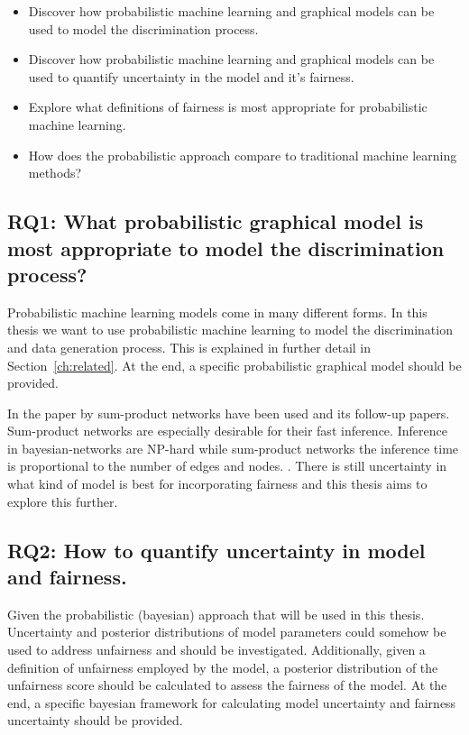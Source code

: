 \begin{itemize}
    \item Discover how probabilistic machine learning and graphical models can be used to model the discrimination process.
    \item Discover how probabilistic machine learning and graphical models can be used to quantify uncertainty in the model and it's fairness.
    \item Explore what definitions of fairness is most appropriate for probabilistic machine learning.
    \item How does the probabilistic approach compare to traditional machine learning methods?
\end{itemize}

\subsection{RQ1: What probabilistic graphical model is most appropriate to model the discrimination process?}

Probabilistic machine learning models come in many different forms. In this thesis we want to use probabilistic machine learning to model the discrimination and data generation process. This is explained in further detail in Section~\ref{ch:related}. At the end, a specific probabilistic graphical model should be provided.

In the paper by \citet{Choi:2021:AIII} sum-product networks have been used and its follow-up papers. Sum-product networks are especially desirable for their fast inference. Inference in bayesian-networks are NP-hard while sum-product networks the inference time is proportional to the number of edges and nodes. \cite{Sánchez-Cauce:2021:TPAMI}. There is still uncertainty in what kind of model is best for incorporating fairness and this thesis aims to explore this further.


\subsection{RQ2: How to quantify uncertainty in model and fairness.}

Given the probabilistic (bayesian) approach that will be used in this thesis. Uncertainty and posterior distributions of model parameters could somehow be used to address unfairness and should be investigated. Additionally, given a definition of unfairness employed by the model, a posterior distribution of the unfairness score should be calculated to assess the fairness of the model. At the end, a specific bayesian framework for calculating model uncertainty and fairness uncertainty should be provided.


